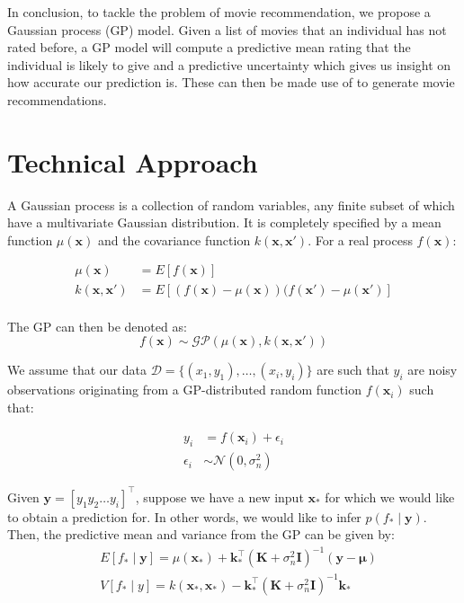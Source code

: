 \documentclass[letterpaper]{article}
\begin{document}
In conclusion, to tackle the problem of movie recommendation, we propose a Gaussian process (GP) model. Given a list of movies that an individual has not rated before, a GP model will compute a predictive mean rating that the individual is likely to give and a predictive uncertainty which gives us insight on how accurate our prediction is. These can then be made use of to generate movie recommendations.

\section{Technical Approach}
A Gaussian process is a collection of random variables, any finite subset of which have a multivariate Gaussian distribution. It is completely specified by a mean function $\mu(\textbf{x})$ and the covariance function $k(\textbf{x}, \textbf{x}')$. For a real process $f(\textbf{x})$:

\begin{align*}
	\mu(\textbf{x}) &= E[f(\textbf{x})] \\
	k(\textbf{x}, \textbf{x}') &= E[(f(\textbf{x}) - \mu(\textbf{x}))(f(\textbf{x}') - \mu(\textbf{x}')] \\
\end{align*}

The GP can then be denoted as:
\[f(\textbf{x}) \sim \mathcal{GP}(\mu(\textbf{x}), k(\textbf{x}, \textbf{x}'))\]

We assume that our data $\mathcal{D} = \{(x_1, y_1), \ldots, (x_i, y_i)\}$ are such that $y_i$ are noisy observations originating from a GP-distributed random function $f(\textbf{x}_i)$ such that:

\begin{align*}
	y_i &= f(\textbf{x}_i) + \epsilon_i \\
	\epsilon_i &\sim \mathcal{N}(0, \sigma_n^2)
\end{align*}

Given $\textbf{y} = [y_1y_2\ldots y_i]^\top$, suppose we have a new input $\textbf{x}_*$ for which we would like to obtain a prediction for. In other words, we would like to infer $p(f_* \mid \textbf{y})$. Then, the predictive mean and variance from the GP can be given by:
\begin{align*}
	&E[f_* \mid \textbf{y}] = \mu(\textbf{x}_*) + \textbf{k}_*^\top (\textbf{K} + \sigma_n^2 \textbf{I})^{-1} (\textbf{y} - \boldsymbol{\mu}) \\
	&V[f_* \mid y] = k(\textbf{x}_*, \textbf{x}_*) - \textbf{k}_*^\top (\textbf{K} + \sigma_n^2 \textbf{I})^{-1} \textbf{k}_* \\
\end{align*}
\end{document}
